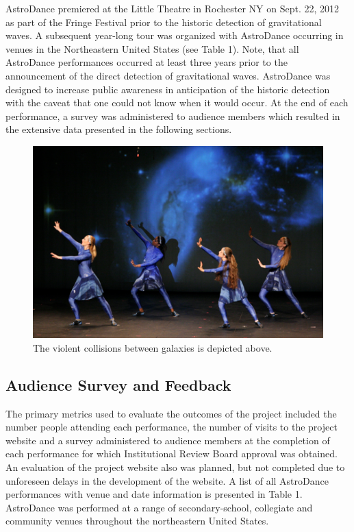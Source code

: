 \documentclass[11.5pt]{sig-alternate} %
\begin{document}
\begin{large}
AstroDance premiered at the Little Theatre in Rochester NY on Sept. 22, 2012 as part of the Fringe Festival prior to the historic detection of gravitational waves.  A subsequent year-long tour was organized with AstroDance occurring in  venues in the Northeastern United States (see Table 1).  Note, that all AstroDance performances occurred at least three years prior to the announcement of the direct detection of gravitational waves.  AstroDance was designed to increase public awareness in anticipation of the historic detection with the caveat that one could not know when it would occur.  At the end of each performance, a survey was administered to audience members which resulted in the extensive data presented in the following sections.

\begin{figure}[!h]
    \centering
    \includegraphics[width=1\linewidth]{Fig_3.png}
    \caption{The violent collisions between galaxies is depicted above.}    
\end{figure}

\subsection*{Audience Survey and Feedback}

The primary metrics used to evaluate the outcomes of the project included the number people attending each performance, the number of visits to the project website and a survey administered to audience members at the completion of each performance for which Institutional Review Board approval was obtained.  An evaluation of the project website also was planned, but not completed due to unforeseen delays in the development of the website.  A list of all AstroDance performances with venue and date information is presented in Table 1.  AstroDance was performed at a range of secondary-school, collegiate and community venues throughout the northeastern United States.


\end{large}
\end{document}
